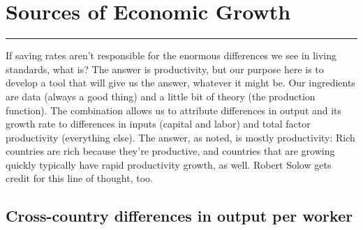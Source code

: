 \chapter{Sources of Economic Growth}\label{chp:grth}
\hypertarget{growth}{}


\rule{\textwidth}{1pt}

If saving rates aren't responsible for
the enormous differences we see in living standards, what is?
The answer is productivity, but our purpose here is to develop
a tool that will give us the answer, whatever it might be.
Our ingredients are data (always a good thing)
and a little bit of theory (the production function).
The combination allows us to attribute differences in output and its
growth rate to differences in inputs (capital and labor)
and total factor productivity (everything else).
The answer, as noted, is mostly productivity:
Rich countries are rich because they're productive,
and countries that are growing quickly typically
have rapid productivity growth, as well.
Robert Solow gets credit for this line of thought, too.


\section{Cross-country differences in output per worker}


